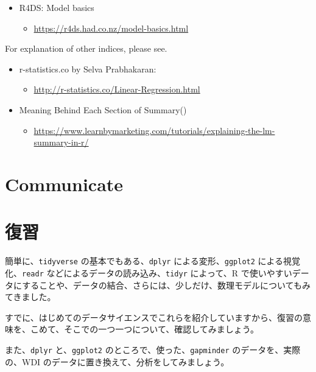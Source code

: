 \documentclass[
  xelatex, ja=standard]{bxjsbook}
\providecommand{\tightlist}{%
  \setlength{\itemsep}{0pt}\setlength{\parskip}{0pt}}
\theoremstyle{definition}
\theoremstyle{definition}
\theoremstyle{definition}
\theoremstyle{definition}
\theoremstyle{remark}
\begin{document}
\begin{itemize}
\tightlist
\item
  R4DS: Model basics

  \begin{itemize}
  \tightlist
  \item
    \url{https://r4ds.had.co.nz/model-basics.html}
  \end{itemize}
\end{itemize}

For explanation of other indices, please see.

\begin{itemize}
\tightlist
\item
  r-statistics.co by Selva Prabhakaran:

  \begin{itemize}
  \tightlist
  \item
    \url{http://r-statistics.co/Linear-Regression.html}
  \end{itemize}
\item
  Meaning Behind Each Section of Summary()

  \begin{itemize}
  \tightlist
  \item
    \url{https://www.learnbymarketing.com/tutorials/explaining-the-lm-summary-in-r/}
  \end{itemize}
\end{itemize}

\hypertarget{communicate}{%
\chapter{Communicate}\label{communicate}}

\hypertarget{aboutfirstexample}{%
\chapter{復習}\label{aboutfirstexample}}

簡単に、\texttt{tidyverse} の基本でもある、\texttt{dplyr} による変形、\texttt{ggplot2} による視覚化、\texttt{readr} などによるデータの読み込み、\texttt{tidyr} によって、R で使いやすいデータにすることや、データの結合、さらには、少しだけ、数理モデルについてもみてきました。

すでに、はじめてのデータサイエンスでこれらを紹介していますから、復習の意味を、こめて、そこでの一つ一つについて、確認してみましょう。

また、\texttt{dplyr} と、\texttt{ggplot2} のところで、使った、\texttt{gapminder} のデータを、実際の、WDI のデータに置き換えて、分析をしてみましょう。
\end{document}
